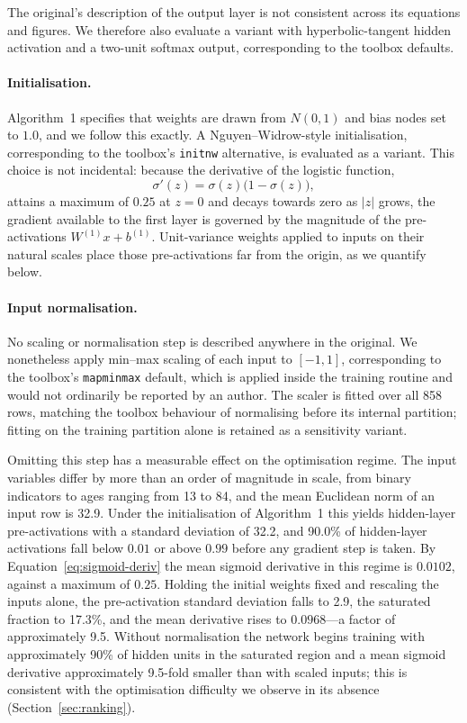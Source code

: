 The original's description of the output layer is not consistent across its
equations and figures. We therefore also evaluate a variant with
hyperbolic-tangent hidden activation and a two-unit softmax output,
corresponding to the toolbox defaults.

\paragraph{Initialisation.} Algorithm~1 specifies that weights are drawn from
$N(0,1)$ and bias nodes set to $1.0$, and we follow this exactly. A
Nguyen--Widrow-style initialisation, corresponding to the toolbox's
\texttt{initnw} alternative, is evaluated as a variant. This choice is not
incidental: because the derivative of the logistic function,
\begin{equation}
\sigma'(z) = \sigma(z)\bigl(1 - \sigma(z)\bigr),
\label{eq:sigmoid-deriv}
\end{equation}
attains a maximum of $0.25$ at $z=0$ and decays towards zero as $|z|$ grows,
the gradient available to the first layer is governed by the magnitude of the
pre-activations $W^{(1)}x + b^{(1)}$. Unit-variance weights applied to inputs
on their natural scales place those pre-activations far from the origin, as we
quantify below.

\paragraph{Input normalisation.} No scaling or normalisation step is described
anywhere in the original. We nonetheless apply min--max scaling of each input
to $[-1,1]$, corresponding to the toolbox's \texttt{mapminmax} default, which
is applied inside the training routine and would not ordinarily be reported by
an author. The scaler is fitted over all 858 rows, matching the toolbox
behaviour of normalising before its internal partition; fitting on the training
partition alone is retained as a sensitivity variant.

Omitting this step has a measurable effect on the optimisation regime. The input variables differ
by more than an order of magnitude in scale, from binary indicators to ages
ranging from 13 to 84, and the mean Euclidean norm of an input row is 32.9.
Under the initialisation of Algorithm~1 this yields hidden-layer
pre-activations with a standard deviation of 32.2, and 90.0\% of hidden-layer
activations fall below $0.01$ or above $0.99$ before any gradient step is
taken. By Equation~\eqref{eq:sigmoid-deriv} the mean sigmoid derivative in this
regime is $0.0102$, against a maximum of $0.25$. Holding the initial weights
fixed and rescaling the inputs alone, the pre-activation standard deviation
falls to 2.9, the saturated fraction to 17.3\%, and the mean derivative rises
to $0.0968$---a factor of approximately 9.5. Without normalisation the network begins training with approximately 90\% of
hidden units in the saturated region and a mean sigmoid derivative
approximately 9.5-fold smaller than with scaled inputs; this is consistent
with the optimisation difficulty we observe in its absence
(Section~\ref{sec:ranking}).

